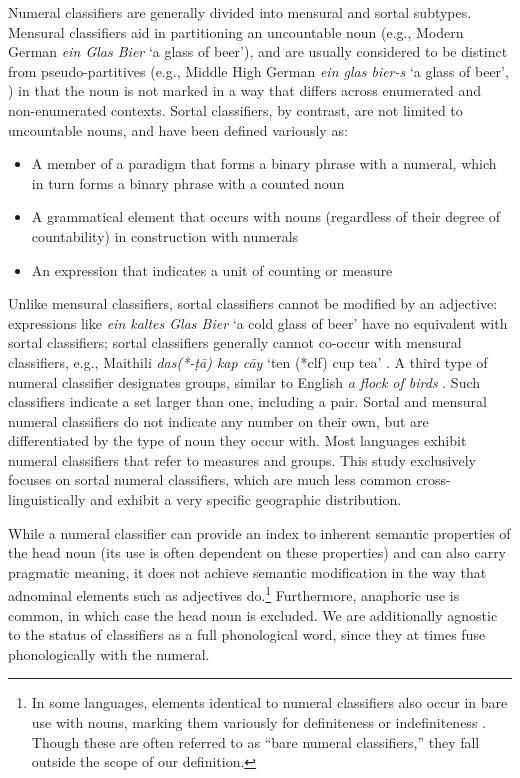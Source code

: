 \documentclass[11pt]{article}
\begin{document}
Numeral classifiers are generally divided into mensural and sortal subtypes. Mensural classifiers aid in partitioning an uncountable noun (e.g., Modern German {\it ein Glas Bier} `a glass of beer'), and are usually considered to be distinct from pseudo-partitives (e.g., Middle High German {\it ein glas bier-s} `a glass of beer', \citealt[33]{Bauer2017}) in that the noun is not marked in a way that differs across enumerated and non-enumerated contexts.
Sortal classifiers, by contrast, are not limited to uncountable nouns, and have been defined variously as:
\begin{itemize}
\item A member of a paradigm that forms a binary phrase with a numeral, which in turn forms a binary phrase with a counted noun \citep{Lehmann2000}
\item A grammatical element that occurs with nouns (regardless of their degree of countability) in construction with numerals \citep{Gil2005}
\item An expression that indicates a unit of counting or measure \citep{Doetjes2012}
\end{itemize}
Unlike mensural classifiers, sortal classifiers cannot be modified by an adjective: expressions like {\it ein kaltes Glas Bier} `a cold glass of beer' have no equivalent with sortal classifiers; sortal classifiers generally cannot co-occur with mensural classifiers, e.g., Maithili {\it das(*-\d{t}\=a) kap c\=ay} `ten (*{\sc clf}) cup tea' \citep[I:117]{Burghart1992}. 
A third type of numeral classifier designates groups, similar to English {\it a flock of birds} \citep[e.g.,][131--133]{Beckwith1998}. Such classifiers indicate a set larger than one, including a pair. Sortal and mensural numeral classifiers do not indicate any number on their own, but are differentiated by the type of noun they occur with. Most languages exhibit numeral classifiers that refer to measures and groups. This study exclusively focuses on sortal numeral classifiers, which are much less common cross-linguistically and exhibit a very specific geographic distribution.

While a numeral classifier can provide an index to inherent semantic properties of the head noun (its use is often dependent on these properties) and can also carry pragmatic meaning, it does not achieve semantic modification in the way that adnominal elements such as adjectives do.\footnote{In some languages, elements identical to numeral classifiers also occur in bare use with nouns, marking them variously for definiteness or indefiniteness \citep{Simpsonetal2011}. Though these are often referred to as ``bare numeral classifiers,'' they fall outside the scope of our definition.}
Furthermore, anaphoric use is common, in which case the head noun is excluded.
We are additionally agnostic to the status of classifiers as a full phonological word, since they at times fuse phonologically with the numeral.
\end{document}
